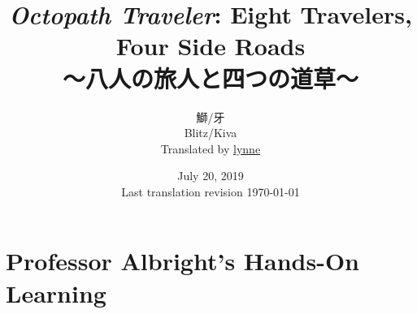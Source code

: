 \documentclass[a4paper,11pt]{memoir}
\title{%
\emph{Octopath Traveler}: Eight Travelers, Four Side Roads \\
\large{～八人の旅人と四つの道草～}
}
\author{%
鰤/牙 \\
Blitz/Kiva \\
Translated by \href{https://lynne.bearblog.dev}{lynne}
}
\date{%
July 20, 2019 \\
Last translation revision \today
}
\begin{document}
	\maketitle
	\pagebreak
	\tableofcontents*
%		
	\mainmatter
	\chapter{Professor Albright's Hands-On Learning}
		
%		
%		
\end{document}
